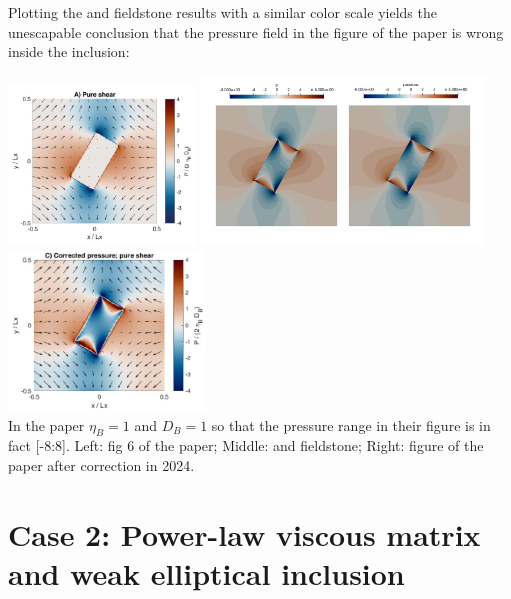 Plotting the \aspect and fieldstone results with a similar
color scale yields the unescapable conclusion that {\color{red} the pressure field 
in the figure of the paper is wrong inside the inclusion}:
\begin{center}
\includegraphics[height=4.25cm]{python_codes/fieldstone_142/images/hams22_cc}
\includegraphics[height=4.5cm]{python_codes/fieldstone_142/results/case1/aspect/press2}
\includegraphics[height=4.25cm]{python_codes/fieldstone_142/images/hams22X}\\
{\captionfont In the paper $\eta_B=1$ and $D_B=1$ so that the pressure range in their
figure is in fact [-8:8]. 
Left: fig 6 of the paper; 
Middle: \aspect and fieldstone;
Right: figure of the paper after correction in 2024.}
\end{center}

\newpage
\section*{Case 2: Power-law viscous matrix and weak elliptical inclusion}



